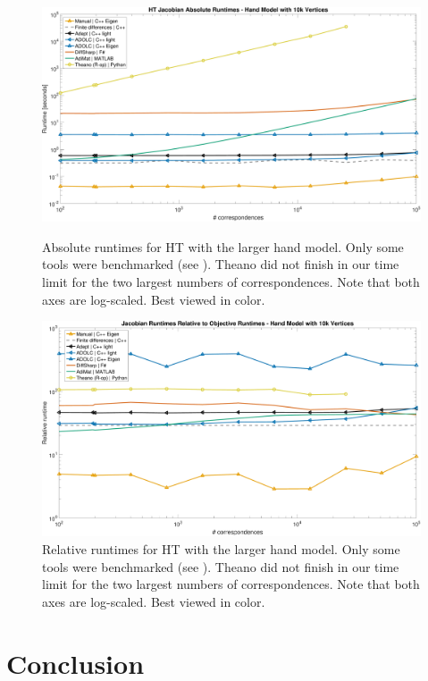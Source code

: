 \documentclass[suppldata]{article}
\begin{document}
\begin{figure}[ht]
    \includegraphics[width=\textwidth]{figs/ht-abs-big-legend}
    \caption{Absolute runtimes for HT with the larger hand model.
  Only some tools were benchmarked (see ).
  Theano did not finish in our time limit for the two largest numbers of correspondences. 
  Note that both axes are log-scaled. Best viewed in color.}
    \label{fig:ht-big-abs}

    \includegraphics[width=\textwidth]{figs/ht-rel-big-legend}
    \caption{Relative runtimes for HT with the larger hand model.
  Only some tools were benchmarked (see ).
  Theano did not finish in our time limit for the two largest numbers of correspondences. 
  Note that both axes are log-scaled. Best viewed in color.}
    \label{fig:ht-big-rel}
\end{figure}
\clearpage

\section{Conclusion}
\label{sec:conc}
\end{document}
